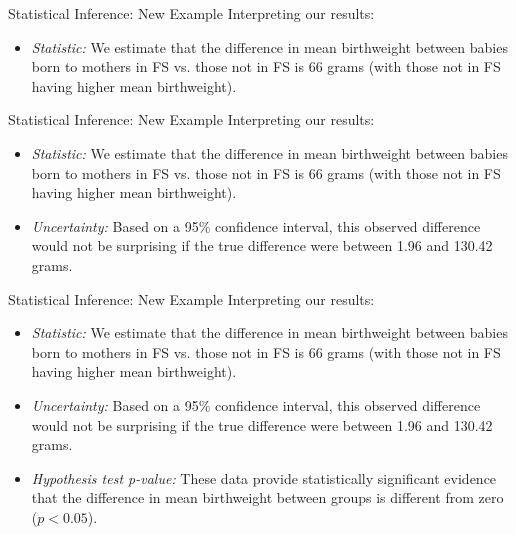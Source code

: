 \documentclass[10pt,t]{beamer}
\begin{document}
\begin{frame}{Statistical Inference: New Example}
Interpreting our results:

\vspace{0.3cm}

\begin{itemize}
	\item \textit{Statistic:} We estimate that the difference in mean birthweight between babies born to mothers in FS vs. those not in FS is 66 grams (with those not in FS having higher mean birthweight).
\end{itemize}

\end{frame}

\begin{frame}{Statistical Inference: New Example}
Interpreting our results:

\vspace{0.3cm}

\begin{itemize}
	\item \textit{Statistic:} We estimate that the difference in mean birthweight between babies born to mothers in FS vs. those not in FS is 66 grams (with those not in FS having higher mean birthweight).
	\item \textit{Uncertainty:} Based on a 95\% confidence interval, this observed difference would not be surprising if the true difference were between 1.96 and 130.42 grams.
\end{itemize}

\end{frame}

\begin{frame}{Statistical Inference: New Example}
Interpreting our results:

\vspace{0.3cm}

\begin{itemize}
	\item \textit{Statistic:} We estimate that the difference in mean birthweight between babies born to mothers in FS vs. those not in FS is 66 grams (with those not in FS having higher mean birthweight).
	\item \textit{Uncertainty:} Based on a 95\% confidence interval, this observed difference would not be surprising if the true difference were between 1.96 and 130.42 grams.
	\item \textit{Hypothesis test p-value:} These data provide statistically significant evidence that the difference in mean birthweight between groups is different from zero ($p < 0.05$).
\end{itemize}

\end{frame}
\end{document}
